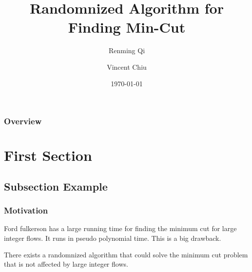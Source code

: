 \documentclass{beamer}
\title[Randomnized Algorithm]{Randomnized Algorithm for Finding Min-Cut } %
\author{Renming Qi \and Vincent Chiu} %
\date{\today} %
\begin{document}
\begin{frame}
\titlepage %
\end{frame}

\begin{frame}
\frametitle{Overview} %
\tableofcontents %
\end{frame}


\section{First Section} %

\subsection{Subsection Example} %




\begin{frame}
\frametitle{Motivation}
\item Ford fulkerson has a large running time for finding the minimum cut for large integer flows. It runs in pseudo polynomial time.  This is a big drawback.
\item There exists a randomnized algorithm that could solve the minimum cut problem that is not affected by large integer flows.


\end{frame}
\end{document}
